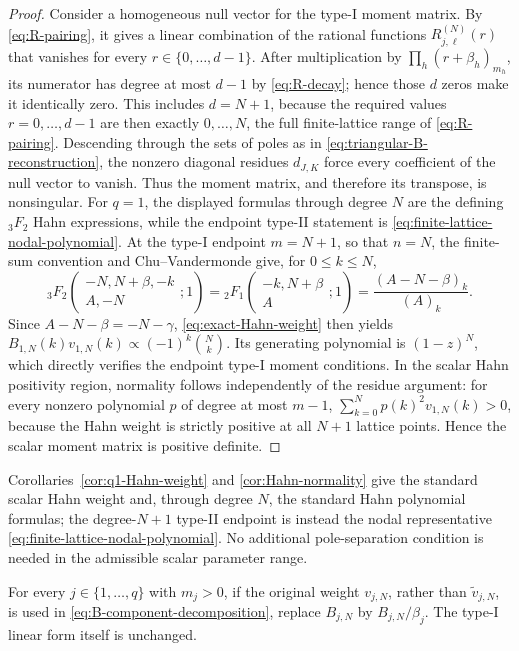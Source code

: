 \documentclass[10pt]{amsart}
\newcommand{\pFq}[5]{{}_{#1}F_{#2}\!\left(\begin{matrix}#3\\#4\end{matrix};#5\right)}
\theoremstyle{plain}
\theoremstyle{definition}
\theoremstyle{remark}
\begin{document}
\begin{proof}
Consider a homogeneous null vector for the type-I moment matrix. By
\eqref{eq:R-pairing}, it gives a linear combination of the rational functions
\(R_{j,\ell}^{(N)}(r)\) that vanishes for every
\(r\in\{0,\ldots,d-1\}\). After multiplication by
\(\prod_h(r+\beta_h)_{m_h}\), its numerator has degree at most \(d-1\)
by \eqref{eq:R-decay}; hence those \(d\) zeros make it identically zero.
This includes
\(d=N+1\), because the required values \(r=0,\ldots,d-1\) are then
exactly \(0,\ldots,N\), the full finite-lattice range of
\eqref{eq:R-pairing}. Descending through the
sets of poles as in \eqref{eq:triangular-B-reconstruction}, the nonzero
diagonal residues \(d_{J,K}\) force every coefficient of the null vector
to vanish. Thus the moment matrix, and therefore its transpose, is
nonsingular. For \(q=1\), the displayed formulas through degree \(N\)
are the defining \({}_3F_2\) Hahn expressions, while the endpoint
type-II statement is \eqref{eq:finite-lattice-nodal-polynomial}. At the
type-I endpoint \(m=N+1\), so that \(n=N\), the finite-sum convention and
Chu--Vandermonde give, for \(0\le k\le N\),
\[
 \pFq{3}{2}{-N,N+\beta,-k}{A,-N}{1}
 =
 \pFq{2}{1}{-k,N+\beta}{A}{1}
 =\frac{(A-N-\beta)_k}{(A)_k}.
\]
Since \(A-N-\beta=-N-\gamma\), \eqref{eq:exact-Hahn-weight} then yields
\(B_{1,N}(k)v_{1,N}(k)\propto(-1)^k\binom Nk\). Its generating
polynomial is \((1-z)^N\), which directly verifies the endpoint
type-I moment conditions. In the scalar Hahn positivity region,
normality follows
independently of the residue argument: for every nonzero polynomial
\(p\) of degree at most \(m-1\),
\(\sum_{k=0}^Np(k)^2v_{1,N}(k)>0\),
because the Hahn weight is strictly positive at all \(N+1\) lattice
points. Hence the scalar moment matrix is positive definite.
\end{proof}

Corollaries~\ref{cor:q1-Hahn-weight} and \ref{cor:Hahn-normality} give the
standard scalar Hahn weight and, through degree \(N\), the standard Hahn
polynomial formulas; the degree-\(N+1\) type-II endpoint is instead the
nodal representative \eqref{eq:finite-lattice-nodal-polynomial}. No
additional pole-separation condition is needed in the admissible scalar
parameter range.

For every \(j\in\{1,\ldots,q\}\) with \(m_j>0\), if the original weight
\(v_{j,N}\), rather than \(\widetilde v_{j,N}\), is used in
\eqref{eq:B-component-decomposition}, replace \(B_{j,N}\) by
\(B_{j,N}/\beta_j\). The type-I linear form itself is unchanged.
\end{document}
